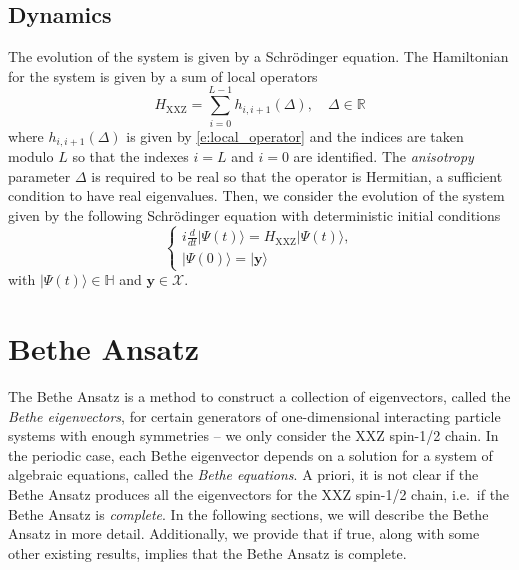 \documentclass[a4paper,11pt]{article}
\theoremstyle{definition}
\begin{document}
\subsection{Dynamics}


The evolution of the system is given by a Schr\"odinger equation. The Hamiltonian for the system is given by a sum of local operators
\begin{equation}\label{e:hamiltonian}
    H_{\mathrm{XXZ}} = \sum_{i=0}^{L-1} h_{i,i+1}(\Delta), \quad \Delta \in \mathbb{R}
\end{equation}
where $h_{i,i+1}(\Delta)$ is given by \eqref{e:local_operator} and the indices are taken modulo $L$ so that the indexes $i =L$ and $i=0$ are identified. The \emph{anisotropy} parameter $\Delta$ is required to be real so that the operator is Hermitian, a sufficient condition to have real eigenvalues. Then, we consider the evolution of the system given by the following Schr\"odinger equation with deterministic initial conditions
\begin{equation}\label{e:schrodinger}
    \begin{cases}
    i \frac{d}{dt} |\Psi(t) \rangle = H_{\mathrm{XXZ}} | \Psi(t) \rangle,\\
    | \Psi(0) \rangle = | \mathbf{y} \rangle
    \end{cases}
\end{equation}
with $|\Psi(t)\rangle \in \mathbb{H}$ and $\mathbf{y} \in \mathcal{X}$.

\section{Bethe Ansatz}\label{s:bethe}

The Bethe Ansatz is a method to construct a collection of eigenvectors, called the \emph{Bethe eigenvectors}, for certain generators of one-dimensional interacting particle systems with enough symmetries -- we only consider the XXZ spin-1/2 chain. In the periodic case, each Bethe eigenvector depends on a solution for a system of algebraic equations, called the \emph{Bethe equations}. A priori, it is not clear if the Bethe Ansatz produces all the eigenvectors for the XXZ spin-1/2 chain, i.e.~if the Bethe Ansatz is \emph{complete}. In the following sections, we will describe the Bethe Ansatz in more detail. Additionally, we provide  that if true, along with some other existing results, implies that the Bethe Ansatz is complete.  
\end{document}
